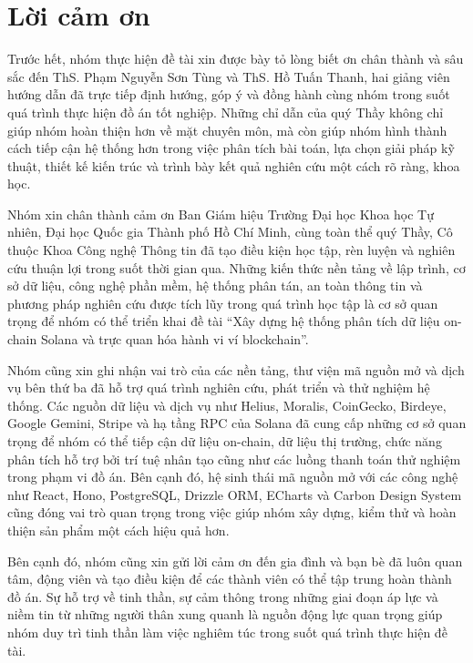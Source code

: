 \chapter*{Lời cảm ơn}
\label{thanks}


Trước hết, nhóm thực hiện đề tài xin được bày tỏ lòng biết ơn chân thành và sâu sắc đến ThS. Phạm Nguyễn Sơn Tùng và ThS. Hồ Tuấn Thanh, hai giảng viên hướng dẫn đã trực tiếp định hướng, góp ý và đồng hành cùng nhóm trong suốt quá trình thực hiện đồ án tốt nghiệp. Những chỉ dẫn của quý Thầy không chỉ giúp nhóm hoàn thiện hơn về mặt chuyên môn, mà còn giúp nhóm hình thành cách tiếp cận hệ thống hơn trong việc phân tích bài toán, lựa chọn giải pháp kỹ thuật, thiết kế kiến trúc và trình bày kết quả nghiên cứu một cách rõ ràng, khoa học.

Nhóm xin chân thành cảm ơn Ban Giám hiệu Trường Đại học Khoa học Tự nhiên, Đại học Quốc gia Thành phố Hồ Chí Minh, cùng toàn thể quý Thầy, Cô thuộc Khoa Công nghệ Thông tin đã tạo điều kiện học tập, rèn luyện và nghiên cứu thuận lợi trong suốt thời gian qua. Những kiến thức nền tảng về lập trình, cơ sở dữ liệu, công nghệ phần mềm, hệ thống phân tán, an toàn thông tin và phương pháp nghiên cứu được tích lũy trong quá trình học tập là cơ sở quan trọng để nhóm có thể triển khai đề tài ``Xây dựng hệ thống phân tích dữ liệu on-chain Solana và trực quan hóa hành vi ví blockchain''.

Nhóm cũng xin ghi nhận vai trò của các nền tảng, thư viện mã nguồn mở và dịch vụ bên thứ ba đã hỗ trợ quá trình nghiên cứu, phát triển và thử nghiệm hệ thống. Các nguồn dữ liệu và dịch vụ như Helius, Moralis, CoinGecko, Birdeye, Google Gemini, Stripe và hạ tầng RPC của Solana đã cung cấp những cơ sở quan trọng để nhóm có thể tiếp cận dữ liệu on-chain, dữ liệu thị trường, chức năng phân tích hỗ trợ bởi trí tuệ nhân tạo cũng như các luồng thanh toán thử nghiệm trong phạm vi đồ án. Bên cạnh đó, hệ sinh thái mã nguồn mở với các công nghệ như React, Hono, PostgreSQL, Drizzle ORM, ECharts và Carbon Design System cũng đóng vai trò quan trọng trong việc giúp nhóm xây dựng, kiểm thử và hoàn thiện sản phẩm một cách hiệu quả hơn.

Bên cạnh đó, nhóm cũng xin gửi lời cảm ơn đến gia đình và bạn bè đã luôn quan tâm, động viên và tạo điều kiện để các thành viên có thể tập trung hoàn thành đồ án. Sự hỗ trợ về tinh thần, sự cảm thông trong những giai đoạn áp lực và niềm tin từ những người thân xung quanh là nguồn động lực quan trọng giúp nhóm duy trì tinh thần làm việc nghiêm túc trong suốt quá trình thực hiện đề tài.

